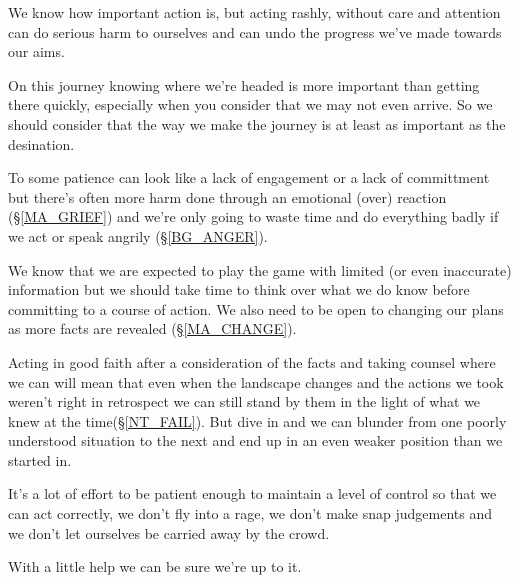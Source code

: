 \cleardoublepage
{ \small
We know how important action is, but acting rashly, without care and attention can do serious harm to ourselves and can undo the progress we've made towards our aims.

On this journey knowing where we're headed is more important than getting there quickly, especially when you consider that we may not even arrive. So we should consider that the way we make the journey is at least as important as the desination.

To some patience can look like a lack of engagement or a lack of committment but there's often more harm done through an emotional (over) reaction (\S \ref{MA_GRIEF}) and we're only going to waste time and do everything badly if we act or speak angrily (\S \ref{BG_ANGER}).

We know that we are expected to play the game with limited (or even inaccurate) information but we should take time to think over what we do know before committing to a course of action. We also need to be open to changing our plans as more facts are revealed (\S \ref{MA_CHANGE}).  

Acting in good faith after a consideration of the facts and taking counsel where we can will mean that even when the landscape changes and the actions we took weren't right in retrospect we can still stand by them in the light of what we knew at the time(\S \ref{NT_FAIL}). But dive in and we can blunder from one poorly understood situation to the next and end up in an even weaker position than we started in. 

It's a lot of effort to be patient enough to maintain a level of control so that we can act correctly, we don't fly into a rage, we don't make snap judgements and we don't let ourselves be carried away by the crowd.

With a little help we can be sure we're up to it.
}

